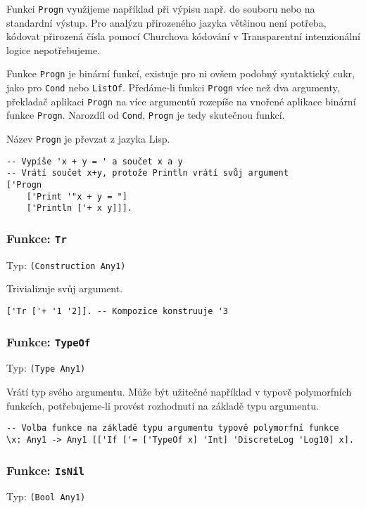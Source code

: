 Funkci \lstinline{Progn} využijeme například při výpisu např. do souboru nebo na standardní výstup.
Pro analýzu přirozeného jazyka většinou není potřeba, kódovat přirozená čísla pomocí Churchova
kódování v Transparentní intenzionální logice nepotřebujeme.

Funkce \lstinline{Progn} je binární funkcí, existuje pro ni ovšem podobný syntaktický cukr, jako pro
\lstinline{Cond} nebo \lstinline{ListOf}. Předáme-li funkci \lstinline{Progn} více než dva
argumenty, překladač aplikaci \lstinline{Progn} na více argumentů rozepíše na vnořené aplikace
binární funkce \lstinline{Progn}. Narozdíl od \lstinline{Cond}, \lstinline{Progn} je tedy
skutečnou funkcí.

Název \lstinline{Progn} je převzat z jazyka Lisp.

\begin{lstlisting}[caption={Ukázka využití Progn}]
-- Vypíše 'x + y = ' a součet x a y
-- Vrátí součet x+y, protože Println vrátí svůj argument
['Progn
    ['Print '"x + y = "]
    ['Println ['+ x y]]].
\end{lstlisting}

\subsubsection*{Funkce: \lstinline{Tr}}
Typ: \lstinline{(Construction Any1)}

Trivializuje svůj argument.

\begin{lstlisting}[caption={Ukázka využití Tr}]
['Tr ['+ '1 '2]]. -- Kompozice konstruuje '3
\end{lstlisting}

\subsubsection*{Funkce: \lstinline{TypeOf}}
Typ: \lstinline{(Type Any1)}

Vrátí typ svého argumentu. Může být užitečné například v typově polymorfních funkcích,
potřebujeme-li provést rozhodnutí na základě typu argumentu.

\begin{lstlisting}[caption={Ukázka využití TypeOf}]
-- Volba funkce na základě typu argumentu typově polymorfní funkce
\x: Any1 -> Any1 [['If ['= ['TypeOf x] 'Int] 'DiscreteLog 'Log10] x].
\end{lstlisting}

\subsubsection*{Funkce: \lstinline{IsNil}}
Typ: \lstinline{(Bool Any1)}

